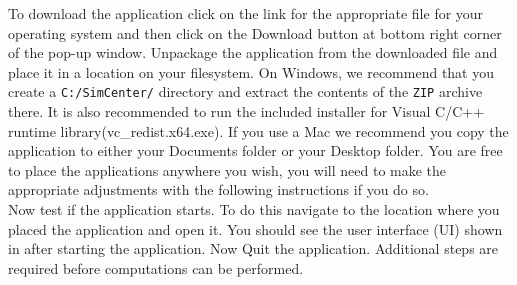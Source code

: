 To download the \texttt{\getsoftwarename{}} application click on the link for
the appropriate file for your operating system and then click on the
Download button at bottom right corner of the pop-up window. 
Unpackage the application from the downloaded
file and place it in a location on your filesystem. On Windows, we
recommend that you create a \texttt{C:/SimCenter/\getsoftwarename{}}
directory and extract the contents of the \texttt{ZIP} archive
there. It is also recommended to run the included installer for Visual C/C++ runtime library(vc\_redist.x64.exe). 
If you use a Mac we recommend you copy the application to either your
Documents folder or your Desktop folder. You are free to place the
applications anywhere you wish, you will need to make the
appropriate adjustments with the following instructions if you do so. \\

Now test if the application starts. To do this navigate to
the location where you placed the application and open it. You should
see the user interface (UI) shown in  after
starting the application. Now Quit the application. Additional steps are required before 
computations can be performed.\\



